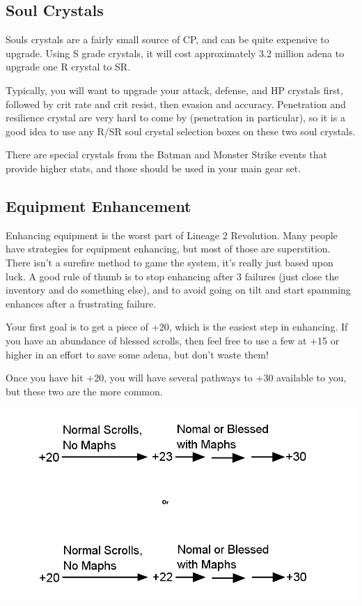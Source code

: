\documentclass[]{article}
\begin{document}
\subsection{Soul Crystals}

Souls crystals are a fairly small source of CP, and can be quite expensive to upgrade.
Using S grade crystals, it will cost approximately 3.2 million adena to upgrade one R crystal to SR.

Typically, you will want to upgrade your attack, defense, and HP crystals first, followed by crit rate and crit resist, then evasion and accuracy.
Penetration and resilience crystal are very hard to come by (penetration in particular), so it is a good idea to use any R/SR soul crystal selection boxes on these two soul crystals.

There are special crystals from the Batman and Monster Strike events that provide higher stats, and those should be used in your main gear set.

\subsection{Equipment Enhancement}

Enhancing equipment is the worst part of Lineage 2 Revolution.
Many people have strategies for equipment enhancing, but most of those are superstition.
There isn't a surefire method to game the system, it's really just based upon luck.
A good rule of thumb is to stop enhancing after 3 failures (just close the inventory and do something else), and to avoid going on tilt and start spamming enhances after a frustrating failure.

Your first goal is to get a piece of +20, which is the easiest step in enhancing.
If you have an abundance of blessed scrolls, then feel free to use a few at +15 or higher in an effort to save some adena, but don't waste them!


Once you have hit +20, you will have several pathways to +30 available to you, but these two are the more common.\\
\begin{center}
	\includegraphics[width=0.7\linewidth]{EnhPath}
\end{center}
\end{document}
